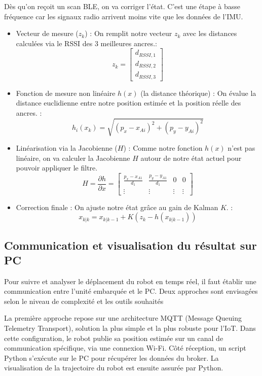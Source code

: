 \documentclass[11pt, a4paper]{article}
\begin{document}
Dès qu'on reçoit un scan BLE, on va corriger l'état. C'est une étape à basse fréquence car les signaux radio arrivent moins vite que les données de l'IMU.

\begin{itemize}
	\item Vecteur de mesure ($z_k$) : On remplit notre vecteur $z_k$ avec les distances calculées via le RSSI des 3 meilleures ancres.:
	 $$z_k = \begin{bmatrix} d_{RSSI,1} \\ d_{RSSI,2} \\ d_{RSSI,3} \end{bmatrix}$$
	\item Fonction de mesure non linéaire $h(x)$ (la distance théorique) : On évalue la distance euclidienne entre notre position estimée et la position réelle des ancres. :
	 $$h_i(x_k) = \sqrt{(p_x - x_{Ai})^2 + (p_y - y_{Ai})^2}$$
	\item Linéarisation via la Jacobienne ($H$) : Comme notre fonction $h(x)$ n'est pas linéaire, on va calculer la Jacobienne $H$ autour de notre état actuel pour pouvoir appliquer le filtre.
	$$H = \frac{\partial h}{\partial x} = \begin{bmatrix} 
\frac{p_x - x_{A1}}{d_1} & \frac{p_y - y_{A1}}{d_1} & 0 & 0 \\ 
\vdots & \vdots & \vdots & \vdots 
\end{bmatrix}$$
	\item Correction finale : On ajuste notre état grâce au gain de Kalman $K$. :
	$$x_{k|k} = x_{k|k-1} + K (z_k - h(x_{k|k-1}))$$

\end{itemize}


\subsection{Communication et visualisation du résultat sur PC}

Pour suivre et analyser le déplacement du robot en temps réel, il faut établir une communication entre l'unité embarquée et le PC.  Deux approches sont envisagées selon le niveau de complexité et les outils souhaités

La première approche repose sur une architecture MQTT (Message Queuing Telemetry Transport), solution la plus simple et la plus robuste pour l’IoT.
Dans cette configuration, le robot publie sa position estimée sur un canal de communication spécifique, via une connexion Wi-Fi. Côté réception, un script Python s’exécute sur le PC pour récupérer les données du broker. La visualisation de la trajectoire du robot est ensuite assurée par Python.
\end{document}
